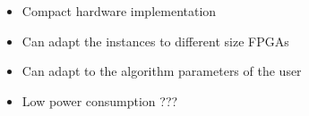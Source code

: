 \begin{itemize}
\item Compact hardware implementation
\item Can adapt the instances to different size FPGAs
\item Can adapt to the algorithm parameters of the user
\item Low power consumption ???
\end{itemize}
